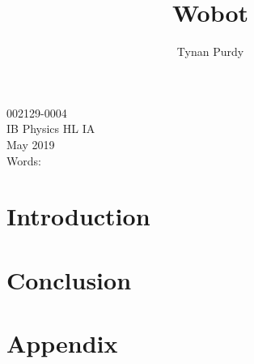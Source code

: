 \documentclass[12pt,letterpaper]{article}
\title{Wobot}
\author{Tynan Purdy}
\date{\vspace{-5ex}}
\begin{document}
\large
\parindent=0.5in
{\fontsize{12}{14.4}
	{\singlespace
	\maketitle
	\begin{center}
	\vspace{4mm}
	002129-0004 \\
	\vspace{4mm}
	IB Physics HL IA \\
	\vspace{4mm}
	May 2019 \\
	\vspace{4mm}
	Words:  \\
	\end{center}
	}
}	

\newpage
{}
\begin{abstract}

\end{abstract}

\newpage
\tableofcontents

\newpage
\section{Introduction}


\section{Conclusion}


\newpage



\newpage
\section{Appendix}
\listoffigures
\end{document}

